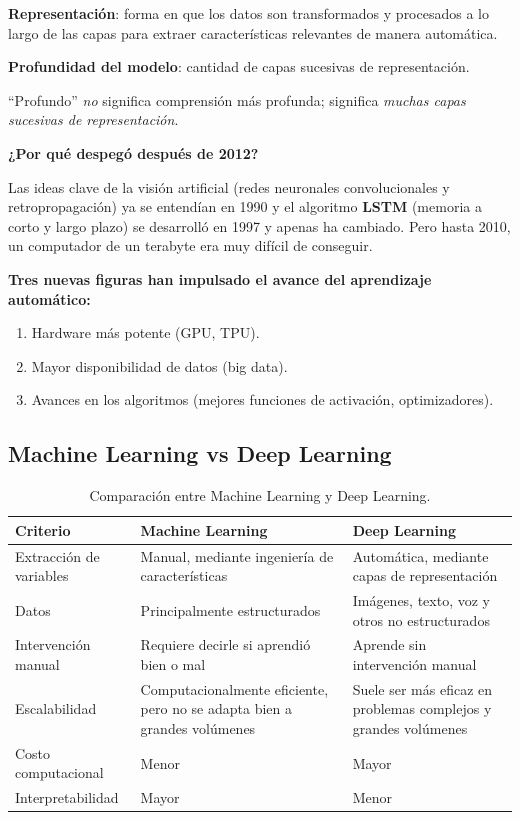 \begin{definicion}
\textbf{Representación}: forma en que los datos son transformados y procesados a lo largo de las capas para extraer características relevantes de manera automática.

\textbf{Profundidad del modelo}: cantidad de capas sucesivas de representación.
\end{definicion}

\begin{advertencia}
``Profundo'' \emph{no} significa comprensión más profunda; significa \emph{muchas capas sucesivas de representación}.
\end{advertencia}

\textbf{¿Por qué despegó después de 2012?}

Las ideas clave de la visión artificial (redes neuronales convolucionales y retropropagación) ya se entendían en 1990 y el algoritmo \textbf{LSTM} (memoria a corto y largo plazo) se desarrolló en 1997 y apenas ha cambiado. Pero hasta 2010, un computador de un terabyte era muy difícil de conseguir.

\textbf{Tres nuevas figuras han impulsado el avance del aprendizaje automático:}
\begin{enumerate}[topsep=2pt,itemsep=1pt]
  \item Hardware más potente (GPU, TPU).
  \item Mayor disponibilidad de datos (big data).
  \item Avances en los algoritmos (mejores funciones de activación, optimizadores).
\end{enumerate}

\subsection{Machine Learning vs Deep Learning}

\begin{table}[H]
\centering
\caption{Comparación entre Machine Learning y Deep Learning.}
\label{tab:ml-vs-dl}
\small
\begin{tabularx}{\textwidth}{@{}lXX@{}}
\toprule
\textbf{Criterio} & \textbf{Machine Learning} & \textbf{Deep Learning} \\
\midrule
Extracción de variables & Manual, mediante ingeniería de características & Automática, mediante capas de representación \\
Datos & Principalmente estructurados & Imágenes, texto, voz y otros no estructurados \\
Intervención manual & Requiere decirle si aprendió bien o mal & Aprende sin intervención manual \\
Escalabilidad & Computacionalmente eficiente, pero no se adapta bien a grandes volúmenes & Suele ser más eficaz en problemas complejos y grandes volúmenes \\
Costo computacional & Menor & Mayor \\
Interpretabilidad & Mayor & Menor \\
\bottomrule
\end{tabularx}
\end{table}

